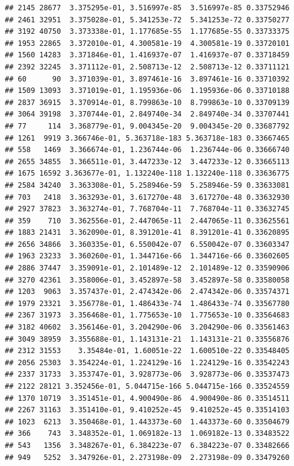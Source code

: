\documentclass[
]{article}
\begin{document}
\begin{verbatim}
## 2145 28677  3.375295e-01, 3.516997e-85  3.516997e-85 0.33752946
## 2461 32951  3.375028e-01, 5.341253e-72  5.341253e-72 0.33750277
## 3192 40750  3.373338e-01, 1.177685e-55  1.177685e-55 0.33733375
## 1953 22865  3.372010e-01, 4.300581e-19  4.300581e-19 0.33720101
## 1560 14283  3.371846e-01, 1.416937e-07  1.416937e-07 0.33718459
## 2392 32245  3.371112e-01, 2.508713e-12  2.508713e-12 0.33711121
## 60      90  3.371039e-01, 3.897461e-16  3.897461e-16 0.33710392
## 1509 13093  3.371019e-01, 1.195936e-06  1.195936e-06 0.33710188
## 2837 36915  3.370914e-01, 8.799863e-10  8.799863e-10 0.33709139
## 3064 39198  3.370744e-01, 2.849740e-34  2.849740e-34 0.33707441
## 77     114  3.368779e-01, 9.004345e-20  9.004345e-20 0.33687792
## 1261  9919 3.366746e-01, 5.363718e-183 5.363718e-183 0.33667465
## 558   1469  3.366674e-01, 1.236744e-06  1.236744e-06 0.33666740
## 2655 34855  3.366511e-01, 3.447233e-12  3.447233e-12 0.33665113
## 1675 16592 3.363677e-01, 1.132240e-118 1.132240e-118 0.33636775
## 2584 34240  3.363308e-01, 5.258946e-59  5.258946e-59 0.33633081
## 703   2418  3.363293e-01, 3.617270e-48  3.617270e-48 0.33632930
## 2927 37823  3.363274e-01, 7.768704e-11  7.768704e-11 0.33632745
## 359    710  3.362556e-01, 2.447065e-11  2.447065e-11 0.33625561
## 1883 21431  3.362090e-01, 8.391201e-41  8.391201e-41 0.33620895
## 2656 34866  3.360335e-01, 6.550042e-07  6.550042e-07 0.33603347
## 1963 23233  3.360260e-01, 1.344716e-66  1.344716e-66 0.33602605
## 2886 37447  3.359091e-01, 2.101489e-12  2.101489e-12 0.33590906
## 3270 42361  3.358006e-01, 3.452897e-58  3.452897e-58 0.33580058
## 1203  9063  3.357437e-01, 2.474342e-06  2.474342e-06 0.33574371
## 1979 23321  3.356778e-01, 1.486433e-74  1.486433e-74 0.33567780
## 2367 31973  3.356468e-01, 1.775653e-10  1.775653e-10 0.33564683
## 3182 40602  3.356146e-01, 3.204290e-06  3.204290e-06 0.33561463
## 3049 38959  3.355688e-01, 1.143131e-21  1.143131e-21 0.33556876
## 2312 31553    3.35484e-01, 1.60051e-22  1.600510e-22 0.33548405
## 2056 25303  3.354224e-01, 1.224129e-16  1.224129e-16 0.33542243
## 2337 31733  3.353747e-01, 3.928773e-06  3.928773e-06 0.33537473
## 2122 28121 3.352456e-01, 5.044715e-166 5.044715e-166 0.33524559
## 1370 10719  3.351451e-01, 4.900490e-86  4.900490e-86 0.33514511
## 2267 31163  3.351410e-01, 9.410252e-45  9.410252e-45 0.33514103
## 1023  6213  3.350468e-01, 1.443373e-60  1.443373e-60 0.33504679
## 366    743  3.348352e-01, 1.069182e-13  1.069182e-13 0.33483522
## 543   1356  3.348267e-01, 6.384223e-07  6.384223e-07 0.33482666
## 949   5252  3.347926e-01, 2.273198e-09  2.273198e-09 0.33479260

\end{verbatim}
\end{document}
